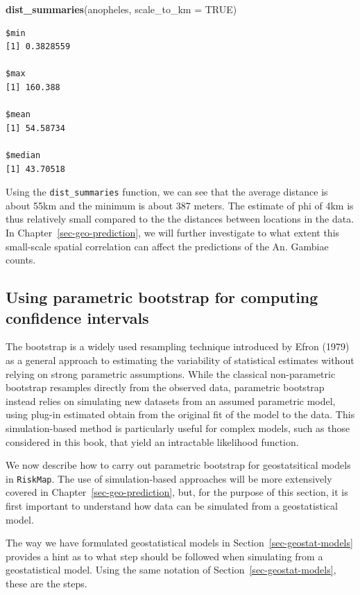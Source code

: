 \documentclass[
  letterpaper,
]{krantz}
\newenvironment{Shaded}{\begin{snugshade}}{\end{snugshade}}
\newcommand{\AttributeTok}[1]{\textcolor[rgb]{0.13,0.29,0.53}{#1}}
\newcommand{\ConstantTok}[1]{\textcolor[rgb]{0.56,0.35,0.01}{#1}}
\newcommand{\FunctionTok}[1]{\textcolor[rgb]{0.13,0.29,0.53}{\textbf{#1}}}
\newcommand{\NormalTok}[1]{#1}
\begin{document}
\begin{Shaded}
\begin{Highlighting}[]
\FunctionTok{dist\_summaries}\NormalTok{(anopheles, }\AttributeTok{scale\_to\_km =} \ConstantTok{TRUE}\NormalTok{)}
\end{Highlighting}
\end{Shaded}

\begin{verbatim}
$min
[1] 0.3828559

$max
[1] 160.388

$mean
[1] 54.58734

$median
[1] 43.70518
\end{verbatim}

Using the \texttt{dist\_summaries} function, we can see that the average
distance is about 55km and the minimum is about 387 meters. The estimate
of phi of 4km is thus relatively small compared to the the distances
between locations in the data. In Chapter~\ref{sec-geo-prediction}, we
will further investigate to what extent this small-scale spatial
correlation can affect the predictions of the An. Gambiae counts.

\subsection{Using parametric bootstrap for computing confidence
intervals}\label{sec-bootstrap}

The bootstrap is a widely used resampling technique introduced by Efron
(1979) as a general approach to estimating the variability of
statistical estimates without relying on strong parametric assumptions.
While the classical non-parametric bootstrap resamples directly from the
observed data, parametric bootstrap instead relies on simulating new
datasets from an assumed parametric model, using plug-in estimated
obtain from the original fit of the model to the data. This
simulation-based method is particularly useful for complex models, such
as those considered in this book, that yield an intractable likelihood
function.

We now describe how to carry out parametric bootstrap for geostatsitical
models in \texttt{RiskMap}. The use of simulation-based approaches will
be more extensively covered in Chapter~\ref{sec-geo-prediction}, but,
for the purpose of this section, it is first important to understand how
data can be simulated from a geostatistical model.

The way we have formulated geostatistical models in
Section~\ref{sec-geostat-models} provides a hint as to what step should
be followed when simulating from a geostatistical model. Using the same
notation of Section~\ref{sec-geostat-models}, these are the steps.
\end{document}
